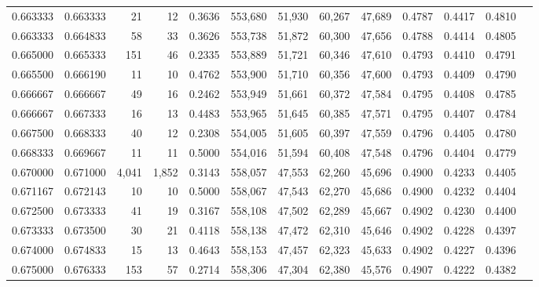 \begin{tabular}{rrrrrrrrrrrrr}
0.663333 & 0.663333 &     21 &    12 &                                     0.3636 & 553,680 &  51,930 &  60,267 &  47,689 & 0.4787 & 0.4417 & 0.4810 \\
0.663333 & 0.664833 &     58 &    33 &                                     0.3626 & 553,738 &  51,872 &  60,300 &  47,656 & 0.4788 & 0.4414 & 0.4805 \\
0.665000 & 0.665333 &    151 &    46 &                                     0.2335 & 553,889 &  51,721 &  60,346 &  47,610 & 0.4793 & 0.4410 & 0.4791 \\
0.665500 & 0.666190 &     11 &    10 &                                     0.4762 & 553,900 &  51,710 &  60,356 &  47,600 & 0.4793 & 0.4409 & 0.4790 \\
0.666667 & 0.666667 &     49 &    16 &                                     0.2462 & 553,949 &  51,661 &  60,372 &  47,584 & 0.4795 & 0.4408 & 0.4785 \\
0.666667 & 0.667333 &     16 &    13 &                                     0.4483 & 553,965 &  51,645 &  60,385 &  47,571 & 0.4795 & 0.4407 & 0.4784 \\
0.667500 & 0.668333 &     40 &    12 &                                     0.2308 & 554,005 &  51,605 &  60,397 &  47,559 & 0.4796 & 0.4405 & 0.4780 \\
0.668333 & 0.669667 &     11 &    11 &                                     0.5000 & 554,016 &  51,594 &  60,408 &  47,548 & 0.4796 & 0.4404 & 0.4779 \\
0.670000 & 0.671000 &  4,041 & 1,852 &                                     0.3143 & 558,057 &  47,553 &  62,260 &  45,696 & 0.4900 & 0.4233 & 0.4405 \\
0.671167 & 0.672143 &     10 &    10 &                                     0.5000 & 558,067 &  47,543 &  62,270 &  45,686 & 0.4900 & 0.4232 & 0.4404 \\
0.672500 & 0.673333 &     41 &    19 &                                     0.3167 & 558,108 &  47,502 &  62,289 &  45,667 & 0.4902 & 0.4230 & 0.4400 \\
0.673333 & 0.673500 &     30 &    21 &                                     0.4118 & 558,138 &  47,472 &  62,310 &  45,646 & 0.4902 & 0.4228 & 0.4397 \\
0.674000 & 0.674833 &     15 &    13 &                                     0.4643 & 558,153 &  47,457 &  62,323 &  45,633 & 0.4902 & 0.4227 & 0.4396 \\
0.675000 & 0.676333 &    153 &    57 &                                     0.2714 & 558,306 &  47,304 &  62,380 &  45,576 & 0.4907 & 0.4222 & 0.4382 \\

\end{tabular}
